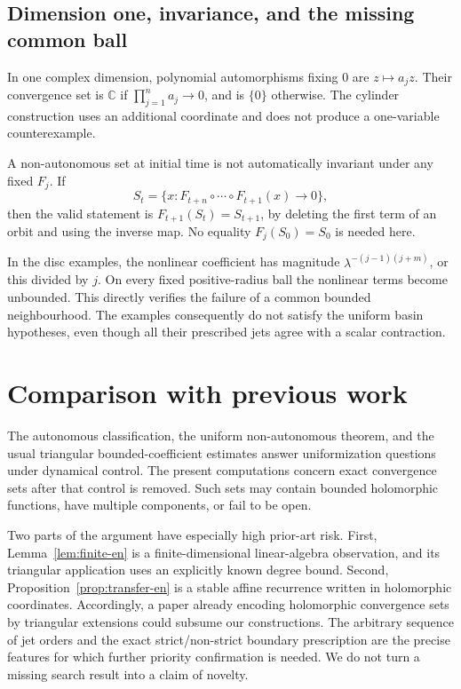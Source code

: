 \documentclass[12pt]{amsart}
\theoremstyle{definition}
\theoremstyle{remark}
\numberwithin{equation}{section}
\newcommand{\C}{\mathbb{C}}
\begin{document}
\subsection{Dimension one, invariance, and the missing common ball}
In one complex dimension, polynomial automorphisms fixing $0$ are $z\mapsto a_jz$. Their convergence set is $\C$ if $\prod_{j=1}^n a_j\to0$, and is $\{0\}$ otherwise. The cylinder construction uses an additional coordinate and does not produce a one-variable counterexample.

A non-autonomous set at initial time is not automatically invariant under any fixed $F_j$. If
\[
S_t=\{x:F_{t+n}\circ\cdots\circ F_{t+1}(x)\to0\},
\]
then the valid statement is $F_{t+1}(S_t)=S_{t+1}$, by deleting the first term of an orbit and using the inverse map. No equality $F_j(S_0)=S_0$ is needed here.

In the disc examples, the nonlinear coefficient has magnitude
$\lambda^{-(j-1)(j+m)}$, or this divided by $j$. On every fixed positive-radius ball the nonlinear terms become unbounded. This directly verifies the failure of a common bounded neighbourhood. The examples consequently do not satisfy the uniform basin hypotheses, even though all their prescribed jets agree with a scalar contraction.

\section{Comparison with previous work}
The autonomous classification, the uniform non-autonomous theorem, and the usual triangular bounded-coefficient estimates answer uniformization questions under dynamical control. The present computations concern exact convergence sets after that control is removed. Such sets may contain bounded holomorphic functions, have multiple components, or fail to be open.

Two parts of the argument have especially high prior-art risk. First, Lemma~\ref{lem:finite-en} is a finite-dimensional linear-algebra observation, and its triangular application uses an explicitly known degree bound. Second, Proposition~\ref{prop:transfer-en} is a stable affine recurrence written in holomorphic coordinates. Accordingly, a paper already encoding holomorphic convergence sets by triangular extensions could subsume our constructions. The arbitrary sequence of jet orders and the exact strict/non-strict boundary prescription are the precise features for which further priority confirmation is needed. We do not turn a missing search result into a claim of novelty.
\end{document}

